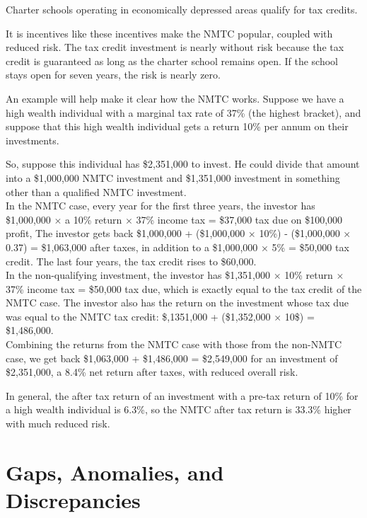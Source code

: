 Charter schools operating in economically depressed areas qualify for tax credits. 

It is incentives like these incentives make the NMTC popular, coupled with reduced risk. The tax credit investment is nearly without risk because the tax credit is guaranteed as long as the charter school remains open. If the school stays open for seven years, the risk is nearly zero.

An example will help make it clear how the NMTC works. Suppose we have a high wealth individual with a marginal tax rate of 37\% (the highest bracket), and suppose that this high wealth individual gets a return 10\% per annum on their investments.

So, suppose this individual has \$2,351,000 to invest. He could divide that amount into a \$1,000,000 NMTC investment and \$1,351,000 investment in something other than a qualified NMTC investment. \\

In the NMTC case, every year for the first three years, the investor has \$1,000,000 $\times$ a 10\% return $\times$ 37\% income tax = \$37,000 tax due on \$100,000 profit, The investor gets back \$1,000,000 + (\$1,000,000 × 10\%) - (\$1,000,000 × 0.37) = \$1,063,000 after taxes, in addition to a \$1,000,000 × 5\% = \$50,000 tax credit. The last four years, the tax credit rises to \$60,000. \\
  
In the non-qualifying investment, the investor has \$1,351,000 $\times$ 10\% return $\times$ 37\% income tax = \$50,000 tax due, which is exactly equal to the tax credit of the NMTC case. The investor also has the return on the investment whose tax due was equal to the NMTC tax credit: \$,1351,000 + (\$1,352,000 $\times$ 10\$) = \$1,486,000.\\

Combining the returns from the NMTC case with those from the non-NMTC case, we get back \$1,063,000 + \$1,486,000 = \$2,549,000 for an investment of \$2,351,000, a 8.4\% net return after taxes, with reduced overall risk.
  
  In general, the after tax return of an investment with a pre-tax return of 10\% for a high wealth individual is 6.3\%, so the NMTC after tax return is 33.3\% higher with much reduced risk.


\section{Gaps,  Anomalies, and Discrepancies}
\label{sec:gaps_anomolies_discrepencies}\indent%

